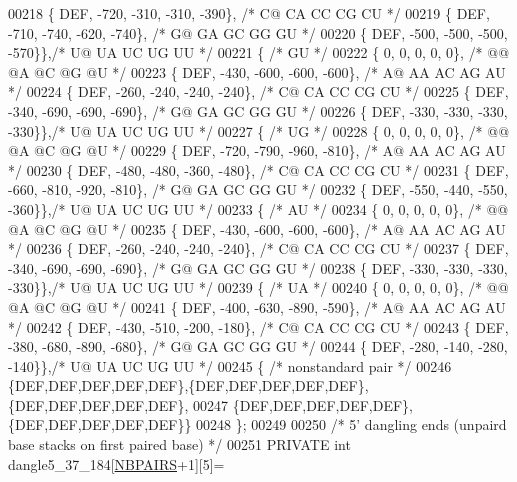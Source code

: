 \begin{DoxyCode}
00218    \{ DEF, -720, -310, -310, -390\}, \textcolor{comment}{/* C@  CA  CC  CG  CU */}
00219    \{ DEF, -710, -740, -620, -740\}, \textcolor{comment}{/* G@  GA  GC  GG  GU */}
00220    \{ DEF, -500, -500, -500, -570\}\},\textcolor{comment}{/* U@  UA  UC  UG  UU */}
00221   \{ \textcolor{comment}{/* GU */}
00222    \{   0,    0,    0,    0,    0\}, \textcolor{comment}{/* @@  @A  @C  @G  @U */}
00223    \{ DEF, -430, -600, -600, -600\}, \textcolor{comment}{/* A@  AA  AC  AG  AU */}
00224    \{ DEF, -260, -240, -240, -240\}, \textcolor{comment}{/* C@  CA  CC  CG  CU */}
00225    \{ DEF, -340, -690, -690, -690\}, \textcolor{comment}{/* G@  GA  GC  GG  GU */}
00226    \{ DEF, -330, -330, -330, -330\}\},\textcolor{comment}{/* U@  UA  UC  UG  UU */}
00227   \{ \textcolor{comment}{/* UG */}
00228    \{   0,    0,    0,    0,    0\}, \textcolor{comment}{/* @@  @A  @C  @G  @U */}
00229    \{ DEF, -720, -790, -960, -810\}, \textcolor{comment}{/* A@  AA  AC  AG  AU */}
00230    \{ DEF, -480, -480, -360, -480\}, \textcolor{comment}{/* C@  CA  CC  CG  CU */}
00231    \{ DEF, -660, -810, -920, -810\}, \textcolor{comment}{/* G@  GA  GC  GG  GU */}
00232    \{ DEF, -550, -440, -550, -360\}\},\textcolor{comment}{/* U@  UA  UC  UG  UU */}
00233   \{ \textcolor{comment}{/* AU */}
00234    \{   0,    0,    0,    0,    0\}, \textcolor{comment}{/* @@  @A  @C  @G  @U */}
00235    \{ DEF, -430, -600, -600, -600\}, \textcolor{comment}{/* A@  AA  AC  AG  AU */}
00236    \{ DEF, -260, -240, -240, -240\}, \textcolor{comment}{/* C@  CA  CC  CG  CU */}
00237    \{ DEF, -340, -690, -690, -690\}, \textcolor{comment}{/* G@  GA  GC  GG  GU */}
00238    \{ DEF, -330, -330, -330, -330\}\},\textcolor{comment}{/* U@  UA  UC  UG  UU */}
00239   \{ \textcolor{comment}{/* UA */}
00240    \{   0,    0,    0,    0,    0\}, \textcolor{comment}{/* @@  @A  @C  @G  @U */}
00241    \{ DEF, -400, -630, -890, -590\}, \textcolor{comment}{/* A@  AA  AC  AG  AU */}
00242    \{ DEF, -430, -510, -200, -180\}, \textcolor{comment}{/* C@  CA  CC  CG  CU */}
00243    \{ DEF, -380, -680, -890, -680\}, \textcolor{comment}{/* G@  GA  GC  GG  GU */}
00244    \{ DEF, -280, -140, -280, -140\}\},\textcolor{comment}{/* U@  UA  UC  UG  UU */}
00245   \{ \textcolor{comment}{/* nonstandard pair */}
00246    \{DEF,DEF,DEF,DEF,DEF\},\{DEF,DEF,DEF,DEF,DEF\},\{DEF,DEF,DEF,DEF,DEF\},
00247    \{DEF,DEF,DEF,DEF,DEF\},\{DEF,DEF,DEF,DEF,DEF\}\}
00248 \};
00249 
00250 \textcolor{comment}{/* 5' dangling ends (unpaird base stacks on first paired base) */}
00251 PRIVATE \textcolor{keywordtype}{int} dangle5\_37\_184[\hyperlink{constants_8h_a5e75221c779d618eab81e096f37e32ce}{NBPAIRS}+1][5]=

\end{DoxyCode}
